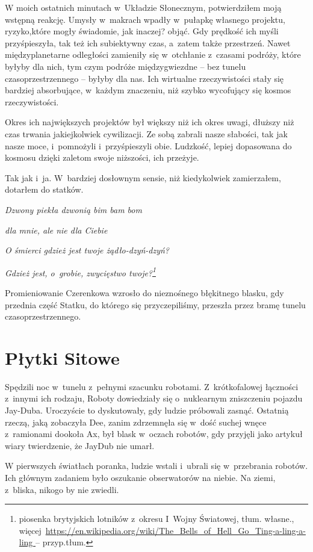\documentclass[oneside,polish,11pt,sfheadings]{mwbk}
\begin{document}
W moich ostatnich minutach w~Układzie Słonecznym, potwierdziłem moją
wstępną reakcję. Umysły w~makrach wpadły w~pułapkę własnego projektu,
ryzyko,które mogły świadomie, jak inaczej? objąć. Gdy prędkość ich myśli
przyśpieszyła, tak też ich subiektywny czas, a~zatem także przestrzeń.
Nawet międzyplanetarne odległości zamieniły się w~otchłanie z~czasami
podróży, które byłyby dla nich, tym czym podróże międzygwiezdne -- bez
tunelu czasoprzestrzennego -- byłyby dla nas. Ich wirtualne
rzeczywistości stały się bardziej absorbujące, w~każdym znaczeniu, niż
szybko wycofujący się kosmos rzeczywistości.

Okres ich największych projektów był większy niż ich okres uwagi,
dłuższy niż czas trwania jakiejkolwiek cywilizacji. Ze sobą zabrali
nasze słabości, tak jak nasze moce, i~pomnożyli i~przyśpieszyli obie.
Ludzkość, lepiej dopasowana do kosmosu dzięki zaletom swoje niższości,
ich przeżyje.

Tak jak i~ja. W~bardziej dosłownym sensie, niż kiedykolwiek zamierzałem,
dotarłem do statków.

\emph{Dzwony piekła dzwonią bim bam bom }

\emph{dla mnie, ale nie dla Ciebie}

\emph{O śmierci gdzież jest twoje żądło-dzyń-dzyń?}

\emph{Gdzież jest, o~grobie, zwycięstwo twoje?\footnote{piosenka brytyjskich
lotników z~okresu I~Wojny Światowej, tłum. własne.,
więcej~\url{https://en.wikipedia.org/wiki/The_Bells_of_Hell_Go_Ting-a-ling-a-ling
} -- przyp.tłum.}}

Promieniowanie Czerenkowa wzrosło do nieznośnego błękitnego blasku, gdy
przednia część Statku, do którego się przyczepiliśmy, przeszła przez
bramę tunelu czasoprzestrzennego.

\chapter{Płytki Sitowe}

Spędzili noc w~tunelu z~pełnymi szacunku robotami. Z~krótkofalowej
łączności z~innymi ich rodzaju, Roboty dowiedziały się o~nuklearnym
zniszczeniu pojazdu Jay-Duba. Uroczyście to dyskutowały, gdy ludzie
próbowali zasnąć. Ostatnią rzeczą, jaką zobaczyła Dee, zanim zdrzemnęła
się w~dość suchej wnęce z~ramionami dookoła Ax, był blask w~oczach
robotów, gdy przyjęli jako artykuł wiary twierdzenie, że Jay\dywiz Dub nie
umarł.

W pierwszych światłach poranka, ludzie wstali i~ubrali się w~przebrania
robotów. Ich głównym zadaniem było oszukanie obserwatorów na niebie. Na
ziemi, z~bliska, nikogo by nie zwiedli.
\end{document}
